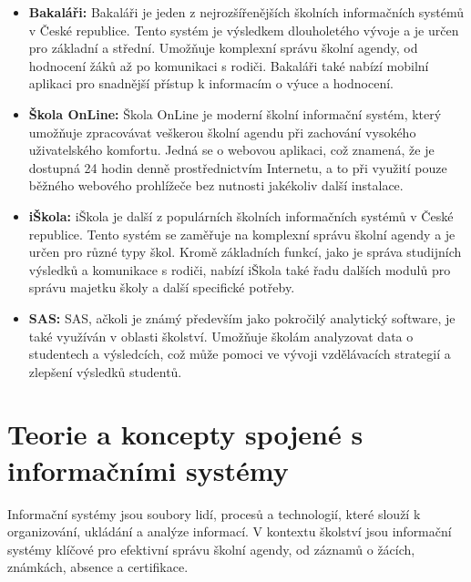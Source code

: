 \documentclass[FM,Proj]{tulthesis}
\begin{document}
\begin{samepage}
    \begin{itemize}
        \item \textbf{Bakaláři:} Bakaláři je jeden z nejrozšířenějších školních informačních 
        systémů v České republice. Tento systém je výsledkem dlouholetého vývoje a je určen pro 
        základní a střední. Umožňuje komplexní správu školní agendy, od hodnocení žáků až po 
        komunikaci s rodiči. Bakaláři také nabízí mobilní aplikaci pro snadnější přístup 
        k informacím o výuce a hodnocení.

        \item \textbf{Škola OnLine:} Škola OnLine je moderní školní informační systém, 
        který umožňuje zpracovávat veškerou školní agendu při zachování vysokého uživatelského 
        komfortu. Jedná se o webovou aplikaci, což znamená, že je dostupná 24 hodin denně 
        prostřednictvím Internetu, a to při využití pouze běžného webového prohlížeče 
        bez nutnosti jakékoliv další instalace.
    
        \item \textbf{iŠkola:} iŠkola je další z populárních školních informačních systémů 
        v České republice. Tento systém se zaměřuje na komplexní správu školní agendy a je 
        určen pro různé typy škol. Kromě základních funkcí, jako je správa studijních 
        výsledků a komunikace s rodiči, nabízí iŠkola také řadu dalších modulů pro 
        správu majetku školy a další specifické potřeby.
    
        \item \textbf{SAS:} SAS, ačkoli je známý především jako pokročilý analytický software, 
        je také využíván v oblasti školství. Umožňuje školám analyzovat data o studentech 
        a výsledcích, což může pomoci ve vývoji vzdělávacích strategií a zlepšení výsledků studentů.
    
    \end{itemize}
\end{samepage}

\section{Teorie a koncepty spojené s informačními systémy}
Informační systémy jsou soubory lidí, procesů a technologií, které slouží k
organizování, ukládání a analýze informací. V kontextu školství jsou
informační systémy klíčové pro efektivní správu školní agendy, od záznamů o žácích, 
známkách, absence a certifikace.
\end{document}
